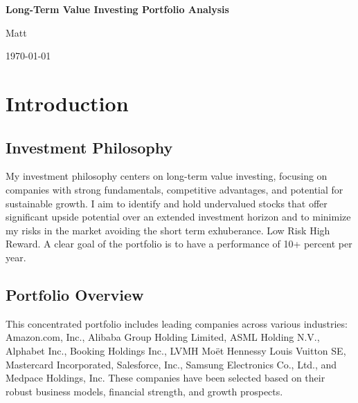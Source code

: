 \documentclass[12pt]{report}
\begin{document}
\begin{titlepage}
    \centering
    \vspace*{2cm}
    {\huge\bfseries Long-Term Value Investing Portfolio Analysis\par}
    \vspace{1.5cm}
    {\Large Matt\par}
    \vfill
    {\large \today\par}
\end{titlepage}

\begin{abstract}
\noindent
This report presents a comprehensive analysis of a quite concentrated, long-term value investing portfolio, the goal is to have maximum 15 diversified positions. Right now the portfolio comprises these different companies here is their initial analyses, the price at which they were bought and their place within the portfolio: Amazon.com, Inc. (AMZN), Alibaba Group Holding Limited (BABA), ASML Holding N.V. (ASML), Alphabet Inc. (GOOGL), Booking Holdings Inc. (BKNG), LVMH Moët Hennessy Louis Vuitton SE (MC.PA), Mastercard Incorporated (MA), Salesforce, Inc. (CRM), Samsung Electronics Co., Ltd. (005930.KS), and Medpace Holdings, Inc. (MEDP). The analysis includes an in-depth examination of each company's business model, financial performance, intrinsic valuation, and associated risks, supporting the investment thesis for each.
\end{abstract}

\tableofcontents
\newpage

\chapter{Introduction}
\section{Investment Philosophy}
My investment philosophy centers on long-term value investing, focusing on companies with strong fundamentals, competitive advantages, and potential for sustainable growth. I aim to identify and hold undervalued stocks that offer significant upside potential over an extended investment horizon and to minimize my risks in the market avoiding the short term exhuberance. Low Risk High Reward. A clear goal of the portfolio is to have a performance of 10+ percent per year.

\section{Portfolio Overview}
This concentrated portfolio includes leading companies across various industries: Amazon.com, Inc., Alibaba Group Holding Limited, ASML Holding N.V., Alphabet Inc., Booking Holdings Inc., LVMH Moët Hennessy Louis Vuitton SE, Mastercard Incorporated, Salesforce, Inc., Samsung Electronics Co., Ltd., and Medpace Holdings, Inc. These companies have been selected based on their robust business models, financial strength, and growth prospects.
\end{document}
